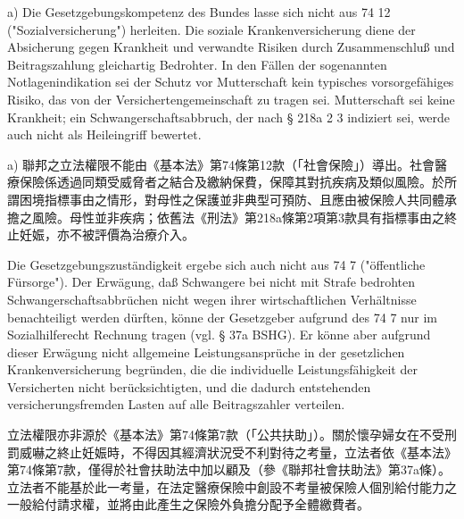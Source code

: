 \documentclass[12pt]{article}
\begin{document}
\begin{sourcepara}[title={原文理由 B.I.2.a} Rn 96]
a) Die Gesetzgebungskompetenz des Bundes lasse sich nicht aus \abbrArt{} 74 \abbrNr{} 12 \abbrGG{}\ggfnArtSeventyFourTwelveDE{} ("Sozialversicherung") herleiten. Die soziale Krankenversicherung diene der Absicherung gegen Krankheit und verwandte Risiken durch Zusammenschluß und Beitragszahlung gleichartig Bedrohter. In den Fällen der sogenannten Notlagenindikation sei der Schutz vor Mutterschaft kein typisches vorsorgefähiges Risiko, das von der Versichertengemeinschaft zu tragen sei. Mutterschaft sei keine Krankheit; ein Schwangerschaftsabbruch, der nach § 218a \abbrAbs{} 2 \abbrNr{} 3 \abbrStGB{} \abbrAF{} indiziert sei, werde auch nicht als Heileingriff bewertet.
\end{sourcepara}
\begin{transpara}
a) 聯邦之立法權限不能由《基本法》第74條第12款\ggfnArtSeventyFourTwelveZH{}（「社會保險」）導出。社會醫療保險係透過同類受威脅者之結合及繳納保費，保障其對抗疾病及類似風險。於所謂困境指標事由之情形，對母性之保護並非典型可預防、且應由被保險人共同體承擔之風險。母性並非疾病；依舊法《刑法》第218a條第2項第3款具有指標事由之終止妊娠，亦不被評價為治療介入。
\end{transpara}

\begin{sourcepara}[title={原文理由 B.I.2.a} Rn 97]
Die Gesetzgebungszuständigkeit ergebe sich auch nicht aus \abbrArt{} 74 \abbrNr{} 7 \abbrGG{}\ggfnArtSeventyFourSevenDE{} ("öffentliche Fürsorge"). Der Erwägung, daß Schwangere bei nicht mit Strafe bedrohten Schwangerschaftsabbrüchen nicht wegen ihrer wirtschaftlichen Verhältnisse benachteiligt werden dürften, könne der Gesetzgeber aufgrund des \abbrArt{} 74 \abbrNr{} 7 \abbrGG{}\ggfnArtSeventyFourSevenDE{} nur im Sozialhilferecht Rechnung tragen (vgl. § 37a BSHG). Er könne aber aufgrund dieser Erwägung nicht allgemeine Leistungsansprüche in der gesetzlichen Krankenversicherung begründen, die die individuelle Leistungsfähigkeit der Versicherten nicht berücksichtigten, und die dadurch entstehenden versicherungsfremden Lasten auf alle Beitragszahler verteilen.
\end{sourcepara}
\begin{transpara}
立法權限亦非源於《基本法》第74條第7款\ggfnArtSeventyFourSevenZH{}（「公共扶助」）。關於懷孕婦女在不受刑罰威嚇之終止妊娠時，不得因其經濟狀況受不利對待之考量，立法者依《基本法》第74條第7款\ggfnArtSeventyFourSevenZH{}，僅得於社會扶助法中加以顧及（參《聯邦社會扶助法》第37a條）。立法者不能基於此一考量，在法定醫療保險中創設不考量被保險人個別給付能力之一般給付請求權，並將由此產生之保險外負擔分配予全體繳費者。
\end{transpara}
\end{document}
